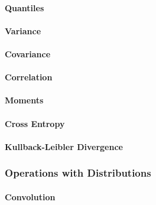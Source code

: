 \paragraph{Quantiles}

\paragraph{Variance}

\paragraph{Covariance}

\paragraph{Correlation}

\paragraph{Moments}






\paragraph{Cross Entropy}


\paragraph{Kullback-Leibler Divergence}



\subsubsection{Operations with Distributions}

\paragraph{Convolution}


